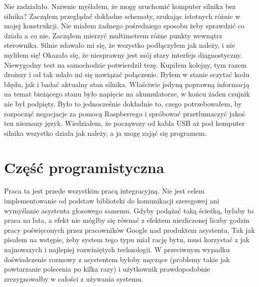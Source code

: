 \documentclass[declaration,shortabstract, inz]{iithesis}
\begin{document}
    Nie zadziałało. Naiwnie myślałem, że mogę uruchomić komputer silnika bez silnika? Zacząłem przeglądać dokładne schematy, szukając istotnych różnic w mojej konstrukcji. Nie miałem żadnego pośredniego sposobu żeby sprawdzić co działa a co nie. Zacząłem mierzyć multimetrem różne punkty wewnątrz sterownika. Silnie zdawało mi się, że wszystko podłączyłem jak należy, i nie myliłem się! Okazało się, że niesprawny jest mój stary interfejs diagnostyczny. Niewygodny test na samochodzie potwierdził tezę. Kupiłem kolejny, tym razem droższy i od tak udało mi się nawiązać połączenie. Byłem w stanie sczytać kodu błędu, jak i badać aktualny stan silnika. Właściwie jedyną poprawną informacją na temat bieżącego stanu było napięcie na akumulatorze, w końcu żaden czujnik nie był podpięty. Było to jednocześnie dokładnie to, czego potrzebowałem, by rozpocząć negocjacje za pomocą Raspberrego i spróbować przetłumaczyć jakoś ten nieznany język. Wiedziałem, że począwszy od kabla USB aż pod komputer silnika wszystko działa jak należy, a ja mogę zająć się programem.

\section{Część programistyczna}
    Praca ta jest przede wszystkim pracą integracyjną. Nie jest celem implementowanie od podstaw biblioteki do komunikacji szeregowej ani wymyślanie asystenta głosowego samemu. Gdyby podążać taką ścieżką, byłaby to praca na lata, a efekt nie mógłby się równać z efektem niezliczonej liczby godzin pracy poświęconych przez pracowników Google nad produktem asystenta. Tak jak pisałem na wstępie, żeby system tego typu miał rację bytu, musi korzystać z jak najnowszych i najlepiej rozwiniętych technologii. W przeciwnym wypadku doświadczenie rozmowy z asystentem byłoby męczące (problemy takie jak powtarzanie polecenia po kilka razy) i użytkownik prawdopodobnie zrezygnowałby w całości z używania systemu. 
    
\end{document}
